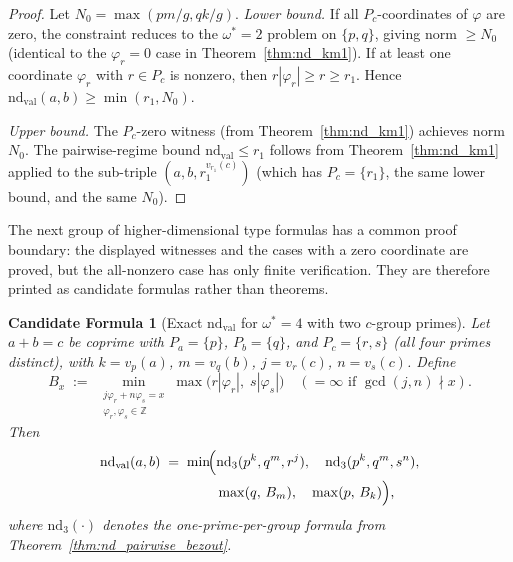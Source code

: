\documentclass[12pt]{article}
\newtheorem{candidate}{Candidate Formula}
\theoremstyle{definition}
\begin{document}
\begin{proof}
  Let $N_0 = \max(pm/g, qk/g)$.
  \textit{Lower bound.}
  If all $P_c$-coordinates of $\varphi$ are zero, the constraint reduces to the
  $\omega^*=2$ problem on $\{p,q\}$, giving norm $\ge N_0$
  (identical to the $\varphi_r=0$ case in Theorem~\ref{thm:nd_km1}).
  If at least one coordinate $\varphi_r$ with $r \in P_c$ is nonzero, then
  $r|\varphi_r| \ge r \ge r_1$.
  Hence $\mathrm{nd}_{\mathrm{val}}(a,b) \ge \min(r_1, N_0)$.

  \textit{Upper bound.}
  The $P_c$-zero witness (from Theorem~\ref{thm:nd_km1}) achieves norm $N_0$.
  The pairwise-regime bound $\mathrm{nd}_{\mathrm{val}} \le r_1$ follows from
  Theorem~\ref{thm:nd_km1} applied to the sub-triple $(a, b, r_1^{v_{r_1}(c)})$
  (which has $P_c = \{r_1\}$, the same lower bound, and the same $N_0$).
\end{proof}

The next group of higher-dimensional type formulas has a common proof boundary:
the displayed witnesses and the cases with a zero coordinate are proved, but the
all-nonzero case has only finite verification.  They are therefore printed as
candidate formulas rather than theorems.

\begin{candidate}[Exact $\mathrm{nd}_{\mathrm{val}}$ for $\omega^*=4$ with two $c$-group primes]\label{thm:nd_omega4_two_c}
  Let $a + b = c$ be coprime with $P_a = \{p\}$, $P_b = \{q\}$, and
  $P_c = \{r, s\}$ (all four primes distinct), with
  $k = v_p(a)$, $m = v_q(b)$, $j = v_r(c)$, $n = v_s(c)$.
  Define
  \[
    B_x \;:=\; \min_{\substack{j\varphi_r + n\varphi_s = x \\ \varphi_r,\varphi_s \in \mathbb{Z}}}
    \max\!\bigl(r|\varphi_r|,\; s|\varphi_s|\bigr)
    \quad (= \infty \text{ if } \gcd(j,n) \nmid x).
  \]
  Then
  \begin{align*}
    \mathrm{nd}_{\mathrm{val}}(a,b) \;=\; \min\!\Bigl(
      &\mathrm{nd}_{3}(p^k, q^m, r^j),\quad
       \mathrm{nd}_{3}(p^k, q^m, s^n),\\
      &\max(q,\, B_m),\quad
       \max(p,\, B_k)
    \Bigr),
  \end{align*}
  where $\mathrm{nd}_{3}(\cdot)$ denotes the one-prime-per-group formula from
  Theorem~\ref{thm:nd_pairwise_bezout}.
\end{candidate}
\end{document}
